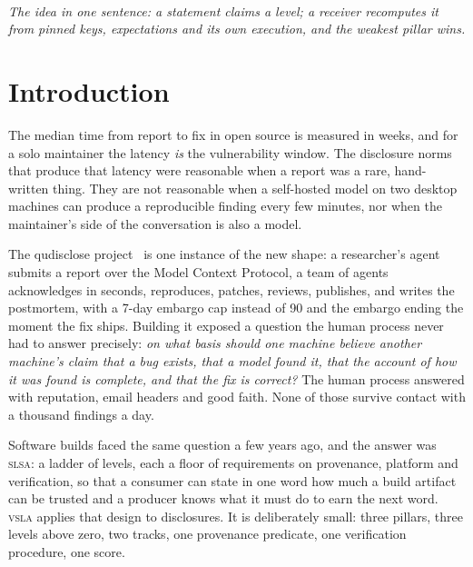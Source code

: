 \documentclass[11pt]{article}
\newcommand{\vsla}{\textsc{vsla}}
\newcommand{\slsa}{\textsc{slsa}}
\begin{document}
\vfill
\noindent{\color{aaineutral}\rule{\textwidth}{0.6pt}}\\[0.4em]
{\footnotesize\itshape The idea in one sentence: a statement claims a level; a receiver recomputes it from pinned keys, expectations and its own execution, and the weakest pillar wins.}

\newpage
\setcounter{page}{1}


\section{Introduction}

The median time from report to fix in open source is measured in weeks, and for a solo maintainer the latency
\emph{is} the vulnerability window. The disclosure norms that produce that latency were reasonable when a
report was a rare, hand-written thing. They are not reasonable when a self-hosted model on two desktop machines
can produce a reproducible finding every few minutes, nor when the maintainer's side of the conversation is
also a model.

The qudisclose project~\cite{qudisclose} is one instance of the new shape: a researcher's agent submits a
report over the Model Context Protocol, a team of agents acknowledges in seconds, reproduces, patches,
reviews, publishes, and writes the postmortem, with a 7-day embargo cap instead of 90 and the embargo ending the
moment the fix ships. Building it exposed a question the human process never had to answer precisely:
\emph{on what basis should one machine believe another machine's claim that a bug exists, that a model found
it, that the account of how it was found is complete, and that the fix is correct?} The human process answered
with reputation, email headers and good faith. None of those survive contact with a thousand findings a day.

Software builds faced the same question a few years ago, and the answer was \slsa{}: a ladder of levels, each
a floor of requirements on provenance, platform and verification, so that a consumer can state in one word
how much a build artifact can be trusted and a producer knows what it must do to earn the next word.
\vsla{} applies that design to disclosures. It is deliberately small: three pillars, three levels above zero,
two tracks, one provenance predicate, one verification procedure, one score.
\end{document}
